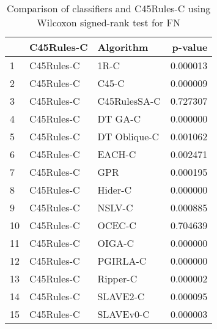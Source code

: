 \begin{table}
\footnotesize
\caption{Comparison of classifiers and C45Rules-C using Wilcoxon signed-rank test for FN}
\label{tab:C45Rules-C wilcoxon FN comparison}
\begin{tabular}{lllr}
\hline
 & C45Rules-C & Algorithm & p-value \\
\hline
1 & C45Rules-C & 1R-C & 0.000013 \\
2 & C45Rules-C & C45-C & 0.000009 \\
3 & C45Rules-C & C45RulesSA-C & 0.727307 \\
4 & C45Rules-C & DT GA-C & 0.000000 \\
5 & C45Rules-C & DT Oblique-C & 0.001062 \\
6 & C45Rules-C & EACH-C & 0.002471 \\
7 & C45Rules-C & GPR & 0.000195 \\
8 & C45Rules-C & Hider-C & 0.000000 \\
9 & C45Rules-C & NSLV-C & 0.000885 \\
10 & C45Rules-C & OCEC-C & 0.704639 \\
11 & C45Rules-C & OIGA-C & 0.000000 \\
12 & C45Rules-C & PGIRLA-C & 0.000000 \\
13 & C45Rules-C & Ripper-C & 0.000002 \\
14 & C45Rules-C & SLAVE2-C & 0.000095 \\
15 & C45Rules-C & SLAVEv0-C & 0.000003 \\
\hline
\end{tabular}
\end{table}
